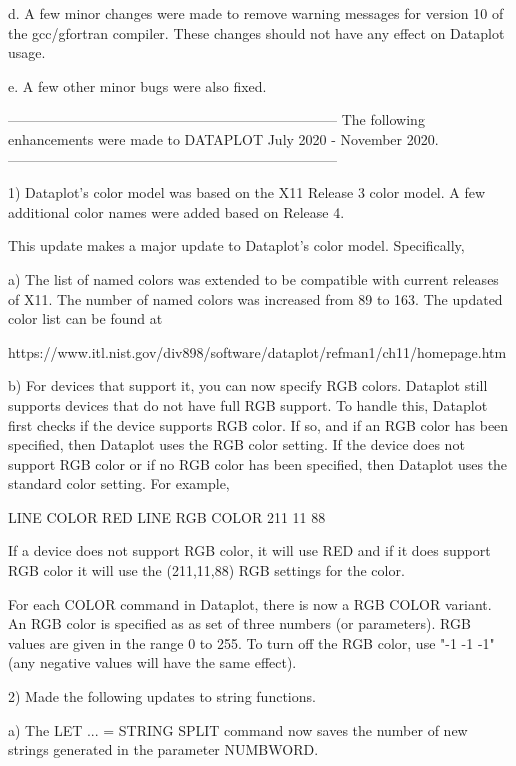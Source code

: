    d. A few minor changes were made to remove warning messages for
       version 10 of the gcc/gfortran compiler.  These changes should
       not have any effect on Dataplot usage.

    e. A few other minor bugs were also fixed.

-----------------------------------------------------------------------
The following enhancements were made to DATAPLOT
July 2020 - November 2020.
-----------------------------------------------------------------------

 1) Dataplot's color model was based on the X11 Release 3 color
    model.  A few additional color names were added based on
    Release 4.

    This update makes a major update to Dataplot's color model.
    Specifically,

    a) The list of named colors was extended to be compatible
       with current releases of X11.  The number of named colors
       was increased from 89 to 163.  The updated color list can
       be found at

          https://www.itl.nist.gov/div898/software/dataplot/refman1/ch11/homepage.htm

    b) For devices that support it, you can now specify RGB colors.
       Dataplot still supports devices that do not have full RGB
       support.  To handle this, Dataplot first checks if the
       device supports RGB color.  If so, and if an RGB color has
       been specified, then Dataplot uses the RGB color setting.
       If the device does not support RGB color or if no RGB color
       has been specified, then Dataplot uses the standard color
       setting.  For example,

           LINE COLOR RED
           LINE RGB COLOR 211 11 88

       If a device does not support RGB color, it will use RED and
       if it does support RGB color it will use the (211,11,88)
       RGB settings for the color.

       For each COLOR command in Dataplot, there is now a
       RGB COLOR variant.  An RGB color is specified as as set
       of three numbers (or parameters).  RGB values are given
       in the range 0 to 255.  To turn off the RGB color, use
       "-1 -1 -1" (any negative values will have the same effect).

 2) Made the following updates to string functions.

    a) The LET ... = STRING SPLIT command now saves the number of new
       strings generated in the parameter NUMBWORD.

